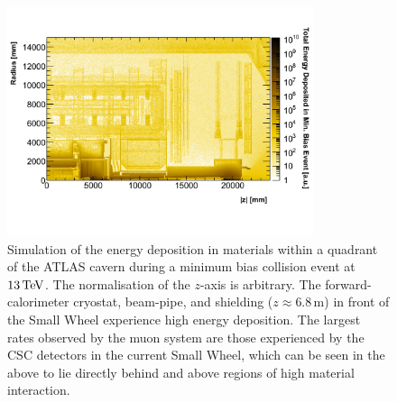 \begin{figure}[!htb]
    \begin{center}
        \includegraphics[width=0.8\textwidth]{figures/nsw/atlas_cavern_bkgPDF}
        \caption{
            Simulation of the energy deposition in materials within a quadrant of the ATLAS cavern
            during a minimum bias collision event at $13\,\text{Te\kern -0.1em V}$.
            The normalisation of the $z$-axis is arbitrary.
            The forward-calorimeter cryostat, beam-pipe, and shielding ($z\approx 6.8$\,m)
            in front of the Small Wheel experience high energy deposition.
            The largest rates observed by the muon system are those experienced
            by the CSC detectors in the current Small Wheel, which can be seen in the above
            to lie directly behind and above regions of high material interaction.
        }
        \label{fig:cavern_bkg}
    \end{center}
\end{figure}

